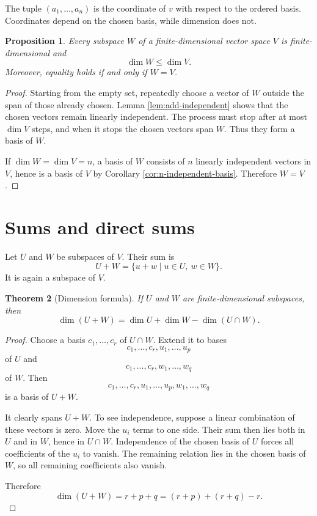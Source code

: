 \documentclass{amsbook}
\newtheorem{theorem}{Theorem}[chapter]
\newtheorem{proposition}[theorem]{Proposition}
\theoremstyle{definition}
\theoremstyle{remark}
\numberwithin{section}{chapter}
\numberwithin{equation}{chapter}
\begin{document}
The tuple $(a_1,\dots,a_n)$ is the coordinate of $v$ with respect to the ordered basis. Coordinates depend on the chosen basis, while dimension does not.

\begin{proposition}\label{prop:subspace-dimension}
	Every subspace $W$ of a finite-dimensional vector space $V$ is finite-dimensional and
	\[
	\dim W\le\dim V.
	\]
	Moreover, equality holds if and only if $W=V$.
\end{proposition}

\begin{proof}
	Starting from the empty set, repeatedly choose a vector of $W$ outside the span of those already chosen. Lemma \ref{lem:add-independent} shows that the chosen vectors remain linearly independent. The process must stop after at most $\dim V$ steps, and when it stops the chosen vectors span $W$. Thus they form a basis of $W$.

	If $\dim W=\dim V=n$, a basis of $W$ consists of $n$ linearly independent vectors in $V$, hence is a basis of $V$ by Corollary \ref{cor:n-independent-basis}. Therefore $W=V$.
\end{proof}

\section{Sums and direct sums}

Let $U$ and $W$ be subspaces of $V$. Their sum is
\[
U+W=\{u+w\mid u\in U,\ w\in W\}.
\]
It is again a subspace of $V$.

\begin{theorem}[Dimension formula]\label{thm:dimension-sum}
	If $U$ and $W$ are finite-dimensional subspaces, then
	\[
	\dim(U+W)
	=
	\dim U+\dim W-\dim(U\cap W).
	\]
\end{theorem}

\begin{proof}
	Choose a basis $c_1,\dots,c_r$ of $U\cap W$. Extend it to bases
	\[
	c_1,\dots,c_r,u_1,\dots,u_p
	\]
	of $U$ and
	\[
	c_1,\dots,c_r,w_1,\dots,w_q
	\]
	of $W$. Then
	\[
	c_1,\dots,c_r,u_1,\dots,u_p,w_1,\dots,w_q
	\]
	is a basis of $U+W$.

	It clearly spans $U+W$. To see independence, suppose a linear combination of these vectors is zero. Move the $u_i$ terms to one side. Their sum then lies both in $U$ and in $W$, hence in $U\cap W$. Independence of the chosen basis of $U$ forces all coefficients of the $u_i$ to vanish. The remaining relation lies in the chosen basis of $W$, so all remaining coefficients also vanish.

	Therefore
	\[
	\dim(U+W)=r+p+q=(r+p)+(r+q)-r.
	\]
\end{proof}
\end{document}
